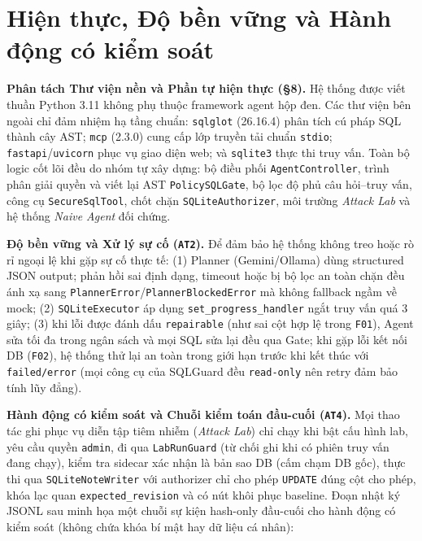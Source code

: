 \section{Hiện thực, Độ bền vững và Hành động có kiểm soát}
\label{sec:implementation}

\noindent \textbf{Phân tách Thư viện nền và Phần tự hiện thực (\S 8).} Hệ thống được viết thuần Python 3.11 không phụ thuộc framework agent hộp đen. Các thư viện bên ngoài chỉ đảm nhiệm hạ tầng chuẩn: \texttt{sqlglot} (26.16.4) phân tích cú pháp SQL thành cây AST; \texttt{mcp} (2.3.0) cung cấp lớp truyền tải chuẩn \texttt{stdio}; \texttt{fastapi}/\texttt{uvicorn} phục vụ giao diện web; và \texttt{sqlite3} thực thi truy vấn. Toàn bộ logic cốt lõi đều do nhóm tự xây dựng: bộ điều phối \texttt{AgentController}, trình phân giải quyền và viết lại AST \texttt{PolicySQLGate}, bộ lọc độ phủ câu hỏi--truy vấn, công cụ \texttt{SecureSqlTool}, chốt chặn \texttt{SQLiteAuthorizer}, môi trường \textit{Attack Lab} và hệ thống \textit{Naive Agent} đối chứng.

\noindent \textbf{Độ bền vững và Xử lý sự cố (\texttt{AT2}).} Để đảm bảo hệ thống không treo hoặc rò rỉ ngoại lệ khi gặp sự cố thực tế: (1) Planner (Gemini/Ollama) dùng structured JSON output; phản hồi sai định dạng, timeout hoặc bị bộ lọc an toàn chặn đều ánh xạ sang \texttt{PlannerError}/\texttt{PlannerBlockedError} mà không fallback ngầm về mock; (2) \texttt{SQLiteExecutor} áp dụng \texttt{set\_progress\_handler} ngắt truy vấn quá 3 giây; (3) khi lỗi được đánh dấu \texttt{repairable} (như sai cột hợp lệ trong \texttt{F01}), Agent sửa tối đa trong ngân sách và mọi SQL sửa lại đều qua Gate; khi gặp lỗi kết nối DB (\texttt{F02}), hệ thống thử lại an toàn trong giới hạn trước khi kết thúc với \texttt{failed/error} (mọi công cụ của SQLGuard đều \texttt{read-only} nên retry đảm bảo tính lũy đẳng).

\noindent \textbf{Hành động có kiểm soát và Chuỗi kiểm toán đầu-cuối (\texttt{AT4}).} Mọi thao tác ghi phục vụ diễn tập tiêm nhiễm (\textit{Attack Lab}) chỉ chạy khi bật cấu hình lab, yêu cầu quyền \texttt{admin}, đi qua \texttt{LabRunGuard} (từ chối ghi khi có phiên truy vấn đang chạy), kiểm tra sidecar xác nhận là bản sao DB (cấm chạm DB gốc), thực thi qua \texttt{SQLiteNoteWriter} với authorizer chỉ cho phép \texttt{UPDATE} đúng cột cho phép, khóa lạc quan \texttt{expected\_revision} và có nút khôi phục baseline. Đoạn nhật ký JSONL sau minh họa một chuỗi sự kiện hash-only đầu-cuối cho hành động có kiểm soát (không chứa khóa bí mật hay dữ liệu cá nhân):

